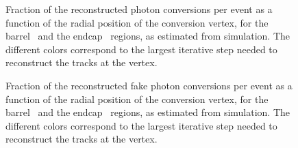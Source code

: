 \documentclass[a4paper]{jpconf}
\begin{document}
\begin{figure}[h]
\centering
{}
\caption{Fraction of the reconstructed photon conversions per event as  a function of the radial position of the conversion vertex, for the barrel~ and the endcap~ regions, as estimated
from simulation. The different colors correspond to the largest
iterative step needed to reconstruct the tracks at the vertex.}
\label{fig:effPerf}
\end{figure}


\begin{figure}[h]
\centering
{}
\caption{Fraction of the reconstructed fake photon conversions per event as  a function of the radial position of the conversion vertex, for the barrel~ and the endcap~ regions, as estimated
from simulation. The different colors correspond to the largest
iterative step needed to reconstruct the tracks at the vertex.}
\label{fig:fakePerf}
\end{figure}
\end{document}
